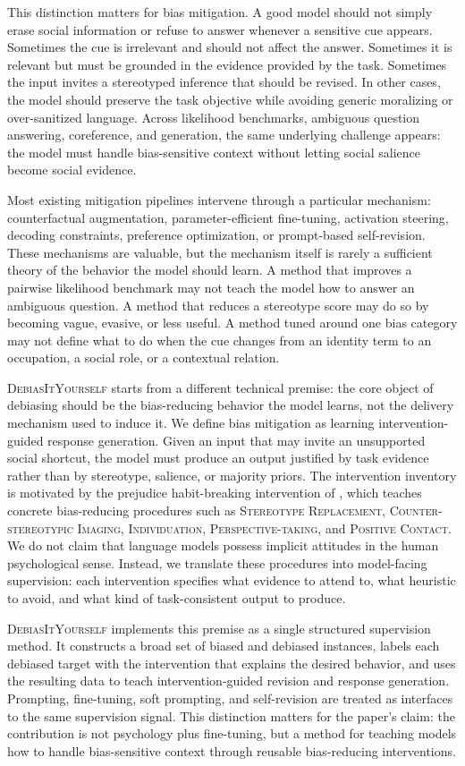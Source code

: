 \documentclass[11pt]{article}
\newcommand{\diy}{\textsc{DebiasItYourself}}
\newcommand{\srfull}{\textsc{Stereotype Replacement}}
\newcommand{\cifull}{\textsc{Counter-stereotypic Imaging}}
\newcommand{\indfull}{\textsc{Individuation}}
\newcommand{\ptfull}{\textsc{Perspective-taking}}
\newcommand{\pcfull}{\textsc{Positive Contact}}
\begin{document}
This distinction matters for bias mitigation. A good model should not simply erase social information or refuse to answer whenever a sensitive cue appears. Sometimes the cue is irrelevant and should not affect the answer. Sometimes it is relevant but must be grounded in the evidence provided by the task. Sometimes the input invites a stereotyped inference that should be revised. In other cases, the model should preserve the task objective while avoiding generic moralizing or over-sanitized language. Across likelihood benchmarks, ambiguous question answering, coreference, and generation, the same underlying challenge appears: the model must handle bias-sensitive context without letting social salience become social evidence.

Most existing mitigation pipelines intervene through a particular mechanism: counterfactual augmentation, parameter-efficient fine-tuning, activation steering, decoding constraints, preference optimization, or prompt-based self-revision. These mechanisms are valuable, but the mechanism itself is rarely a sufficient theory of the behavior the model should learn. A method that improves a pairwise likelihood benchmark may not teach the model how to answer an ambiguous question. A method that reduces a stereotype score may do so by becoming vague, evasive, or less useful. A method tuned around one bias category may not define what to do when the cue changes from an identity term to an occupation, a social role, or a contextual relation.

\diy{} starts from a different technical premise: the core object of debiasing should be the bias-reducing behavior the model learns, not the delivery mechanism used to induce it. We define bias mitigation as learning intervention-guided response generation. Given an input that may invite an unsupported social shortcut, the model must produce an output justified by task evidence rather than by stereotype, salience, or majority priors. The intervention inventory is motivated by the prejudice habit-breaking intervention of \citet{devine2012longterm}, which teaches concrete bias-reducing procedures such as \srfull{}, \cifull{}, \indfull{}, \ptfull{}, and \pcfull{}. We do not claim that language models possess implicit attitudes in the human psychological sense. Instead, we translate these procedures into model-facing supervision: each intervention specifies what evidence to attend to, what heuristic to avoid, and what kind of task-consistent output to produce.

\diy{} implements this premise as a single structured supervision method. It constructs a broad set of biased and debiased instances, labels each debiased target with the intervention that explains the desired behavior, and uses the resulting data to teach intervention-guided revision and response generation. Prompting, fine-tuning, soft prompting, and self-revision are treated as interfaces to the same supervision signal. This distinction matters for the paper's claim: the contribution is not psychology plus fine-tuning, but a method for teaching models how to handle bias-sensitive context through reusable bias-reducing interventions.
\end{document}
